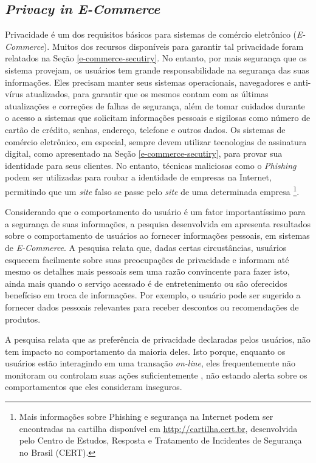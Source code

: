 \subsection{\textit{Privacy in E-Commerce} \cite{berendt2005privacy}}

Privacidade é um dos requisitos básicos para sistemas de comércio eletrônico (\textit{E-Commerce}). Muitos dos recursos disponíveis para garantir tal privacidade foram relatados na Seção \ref{e-commerce-secutiry}. No entanto, por mais segurança que os sistema provejam, os usuários tem grande responsabilidade na segurança das suas informações. Eles precisam manter seus sistemas operacionais, navegadores e anti-vírus atualizados, para garantir que os mesmos contam com as últimas atualizações e correções de falhas de segurança, além de tomar cuidados durante o acesso a sistemas que solicitam informações pessoais e sigilosas como número de cartão de crédito, senhas, endereço, telefone e outros dados. Os sistemas de comércio eletrônico, em especial, sempre devem utilizar tecnologias de assinatura digital, como apresentado na Seção \ref{e-commerce-secutiry}, para provar sua identidade para seus clientes. No entanto, técnicas maliciosas como o \textit{Phishing} podem ser utilizadas para roubar a identidade de empresas na Internet, permitindo que um \textit{site} falso se passe pelo \textit{site} de uma determinada empresa \footnote{Mais informações sobre Phishing e segurança na Internet podem ser encontradas na cartilha disponível em \url{http://cartilha.cert.br}, desenvolvida pelo Centro de Estudos, Resposta e Tratamento de Incidentes de Segurança no Brasil (CERT).}.

Considerando que o comportamento do usuário é um fator importantíssimo para a segurança de suas informações, a pesquisa desenvolvida em \cite{berendt2005privacy} apresenta resultados sobre o comportamento de usuários ao fornecer informações pessoais, em sistemas de \textit{E-Commerce}.
A pesquisa relata que, dadas certas circustâncias, usuários esquecem facilmente sobre suas preocupações de privacidade e informam até mesmo os detalhes mais pessoais sem uma razão convincente para fazer isto, ainda mais quando o serviço acessado é de entretenimento ou são oferecidos benefíciso em troca de informações. Por exemplo, o usuário pode ser sugerido a fornecer dados pessoais relevantes para receber descontos ou recomendações de produtos.

A pesquisa relata que as preferência de privacidade declaradas pelos usuários, não tem impacto no comportamento da maioria deles. Isto porque, enquanto os usuários estão interagindo em uma transação \textit{on-line}, eles frequentemente não monitoram ou controlam suas ações suficientemente \cite{berendt2005privacy}, não estando alerta sobre os comportamentos que eles consideram inseguros.
